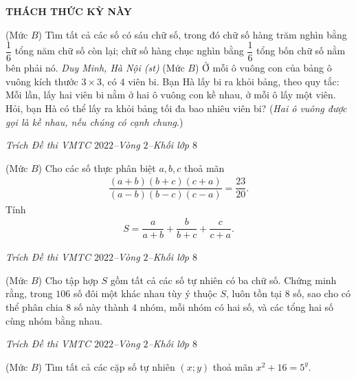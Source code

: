 \begin{center}
	\vspace*{-5pt}
	\textbf{\color{thachthuctoanhoc}\color{thachthuctoanhoc}\color{thachthuctoanhoc}THÁCH THỨC KỲ NÀY}
	\vspace*{-5pt}
\end{center}
\begin{multicols}{2}
	\setlength{\abovedisplayskip}{4pt}
	\setlength{\belowdisplayskip}{4pt}
	{}
	(Mức $B$) Tìm tất cả các số có sáu chữ số, trong đó chữ số hàng trăm nghìn bằng $\dfrac16$ tổng năm chữ số còn lại; chữ số hàng chục nghìn bằng $\dfrac16$  tổng bốn chữ số nằm bên phải nó.
	\vskip 0.05cm
	\hfill	\textit{\small Duy Minh, Hà Nội (st)}
	\vskip 0.05cm
	{}
	(Mức $B$)  Ở mỗi ô vuông con của bảng ô vuông kích thước $3\times3$, có $4$ viên bi. Bạn Hà lấy bi ra khỏi bảng, theo quy tắc: Mỗi lần, lấy hai viên bi nằm ở hai ô vuông con kề nhau, ở mỗi ô lấy một viên. Hỏi, bạn Hà có thể lấy ra khỏi bảng tối đa bao nhiêu viên bi?
	\vskip 0.05cm
	({\it Hai ô vuông được gọi là kề nhau, nếu chúng có cạnh chung}.)
	\begin{flushright}
		\textit{\small Trích Đề thi VMTC $2022$--Vòng $2$--Khối lớp $8$}
	\end{flushright}
	{\color{thachthuctoanhoc}{\usefont{T5}{qag}{b}{n} P693.}}
	(Mức $B$) Cho các số thực phân biệt $a,b,c$  thoả mãn
	\begin{align*}
		\dfrac{(a+b)(b+c)(c+a)}{(a-b)(b-c)(c-a)}=\dfrac{23}{20}.
	\end{align*}
	Tính
	\begin{align*}
		S=\dfrac{a}{a+b}+\dfrac{b}{b+c}+\dfrac{c}{c+a}.
	\end{align*}
	\begin{flushright}
		\textit{\small Trích Đề thi VMTC $2022$--Vòng $2$--Khối lớp $8$}
	\end{flushright}
	{\color{thachthuctoanhoc}{\usefont{T5}{qag}{b}{n} P694.}}
	(Mức $B$) Cho tập hợp $S$ gồm tất cả các số tự nhiên có ba chữ số. Chứng minh rằng, trong $106$ số đôi một khác nhau tùy ý thuộc $S$, luôn tồn tại $8$ số, sao cho có thể phân chia $8$ số này thành $4$ nhóm, mỗi nhóm có hai số, và các tổng hai số cùng nhóm bằng nhau.
	\begin{flushright}
		\textit{\small Trích Đề thi VMTC $2022$--Vòng $2$--Khối lớp $8$}
	\end{flushright}
	{}
	(Mức $B$) Tìm tất cả các cặp số tự nhiên $(x;y)$ thoả mãn $x^2+16=5^y$. 

\end{multicols}
